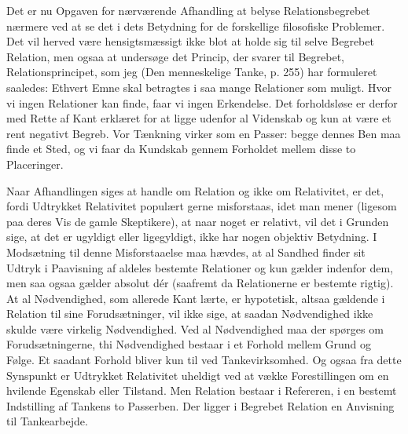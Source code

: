 \documentclass[12pt]{article}
\newcommand{\opage}[1]{\marginnote{\footnotesize\textit{[#1]}}}
\begin{document}
Det er nu Opgaven for nærværende Afhandling at belyse Relationsbegrebet
nærmere ved at se det i dets Betydning for de forskellige filosofiske
Problemer. Det vil herved være hensigtsmæssigt ikke blot at holde sig til
selve Begrebet Relation, men ogsaa at undersøge det Princip, der svarer til
Begrebet, Relationsprincipet, som jeg (\guillemotright Den menneskelige
Tanke\guillemotleft, p. 255) har formuleret saaledes: Ethvert Emne skal
betragtes i saa mange Relationer som muligt. Hvor vi ingen Relationer kan
finde, faar vi ingen Erkendelse. Det forholdsløse er derfor med Rette af Kant
erklæret for at ligge udenfor al Videnskab og kun at være et rent negativt
Begreb. Vor Tænkning virker som en Passer: begge dennes Ben maa finde et Sted,
og vi faar da Kundskab gennem Forholdet mellem disse to Placeringer.

Naar Afhandlingen siges at handle om \guillemotright Relation\guillemotleft{}
og ikke om \guillemotright Relativitet\guillemotleft, er det, fordi Udtrykket
\guillemotright Relativitet\guillemotleft{} populært gerne misforstaas, idet
man mener (ligesom paa deres Vis de gamle Skeptikere), at naar noget er
relativt, vil det i Grunden sige, at det er ugyldigt eller ligegyldigt, ikke
har nogen objektiv Betydning. I Modsætning til denne Misforstaaelse maa
hævdes, at al Sandhed finder sit Udtryk i Paavisning af aldeles bestemte
Relationer og kun gælder indenfor dem, men saa ogsaa gælder absolut dér
(saafremt da Relationerne er bestemte rigtig). At al Nødvendighed, som
allerede Kant lærte, er hypotetisk, altsaa gældende i Relation til sine
Forudsætninger, vil ikke sige,
\opage{16} at saadan Nødvendighed ikke skulde være virkelig Nødvendighed. Ved al
Nødvendighed maa der spørges om Forudsætningerne, thi Nødvendighed bestaar i et
Forhold mellem Grund og Følge. Et saadant Forhold bliver kun til ved
Tankevirksomhed. Og ogsaa fra dette Synspunkt er Udtrykket
\guillemotright{}Relativitet\guillemotleft{} uheldigt ved at vække
Forestillingen om en hvilende Egenskab eller Tilstand. Men Relation bestaar i
Refereren, i en bestemt Indstilling af Tankens to Passerben. Der ligger i
Begrebet Relation en Anvisning til Tankearbejde.
\end{document}
